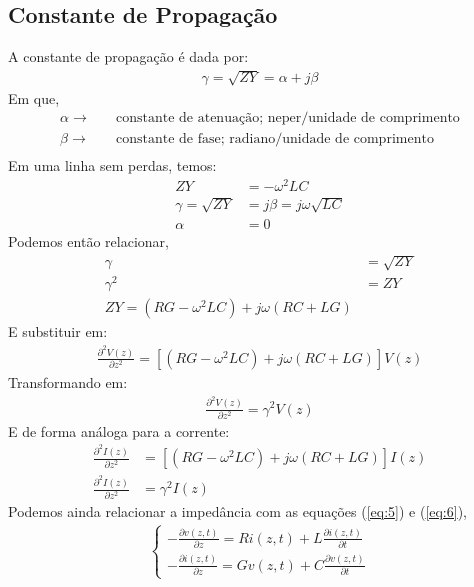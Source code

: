 \documentclass[11pt,a4paper]{article}
\begin{document}
\subsection{Constante de Propagação}
A constante de propagação é dada por:
\begin{align*}
  \gamma = \sqrt{ZY} = \alpha + j \beta
\end{align*}
Em que,
\begin{align*}
  \alpha  \to & \quad \text{constante de atenuação; neper/unidade de comprimento} \\
  \beta \to & \quad \text{constante de fase; radiano/unidade de comprimento} \\
\end{align*}
Em uma linha sem perdas, temos:
\begin{align*}
  ZY &= -\omega^2 LC\\
  \gamma = \sqrt{ZY} &=j \beta = j \omega \sqrt{LC}\\
  \alpha &= 0
\end{align*}
Podemos então relacionar,
\begin{align*}
  \gamma &= \sqrt{ZY} \\
   \gamma^2 &= ZY \\
   ZY = (RG - \omega^2 LC)+ j \omega (RC + LG)
\end{align*}
E substituir em:
\begin{align*}
  \frac{\partial^2 V(z)}{\partial z^2} = \left[ (RG - \omega^2 LC) + j \omega (RC+LG) \right]V(z) 
\end{align*}
Transformando em:
\begin{align*}
\frac{\partial^2 V(z)}{\partial z^2}= \gamma^2 V(z)
\end{align*}
E de forma análoga para a corrente:
\begin{align*}
  \frac{\partial^2 I(z)}{\partial z^2} &= \left[ (RG - \omega^2 LC) + j \omega (RC+LG) \right]I(z) \\
\frac{\partial^2 I(z)}{\partial z^2} &= \gamma^2 I(z)
\end{align*}
Podemos ainda relacionar a impedância com as equações (\ref{eq:5}) e (\ref{eq:6}),
\begin{align*}
  \begin{cases}
    - \frac{\partial v(z,t)}{\partial z}  = Ri(z,t) + L \frac{\partial i(z,t)}{\partial t} \\
    - \frac{\partial i(z,t)}{\partial  z} = G v(z,t) + C \frac{\partial v(z,t)}{\partial t}
  \end{cases}   
\end{align*}
\end{document}
